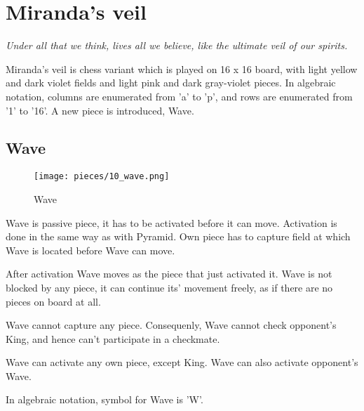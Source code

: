 
\chapter*{Miranda's veil}

\begin{flushright}
\parbox{0.8\textwidth}{
\emph{Under all that we think, lives all we believe, like the ultimate veil of our spirits. \\
 } }
\end{flushright}

\noindent
Miranda's veil is chess variant which is played on 16 x 16 board,
with light yellow and dark violet fields and light pink and dark
gray-violet pieces. In algebraic notation, columns are enumerated
from 'a' to 'p', and rows are enumerated from '1' to '16'. A new
piece is introduced, Wave.

\clearpage

\section*{Wave}

\noindent
\begin{wrapfigure}[12]{l}{0.4\textwidth}
\texttt{[image: pieces/10\_wave.png]}
\caption{Wave}
\label{fig:wave}
\end{wrapfigure}
Wave is passive piece, it has to be activated before it can move.
Activation is done in the same way as with Pyramid. Own piece
has to capture field at which Wave is located before Wave can
move.

After activation Wave moves as the piece that just activated it.
Wave is not blocked by any piece, it can continue its' movement
freely, as if there are no pieces on board at all.

Wave cannot capture any piece. Consequenly, Wave cannot check
opponent's King, and hence can't participate in a checkmate.

Wave can activate any own piece, except King. Wave can also
activate opponent's Wave.

In algebraic notation, symbol for Wave is 'W'.

